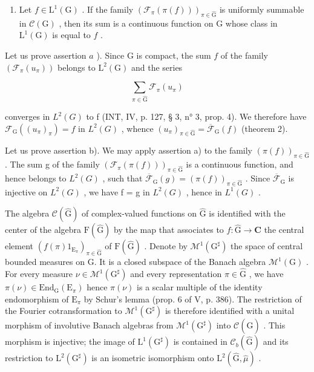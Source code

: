 \begin{enumerate}
\def\labelenumi{\alph{enumi})}
\setcounter{enumi}{1}
\tightlist
\item
  Let \(f \in \mathrm{L}^1(\mathrm{G})\) . If the family \((\mathcal{F}_\pi(\pi(f)))_{\pi \in \widehat{\mathrm{G}}}\) is uniformly summable in \(\mathcal{C}(\mathrm{G})\) , then its sum is a continuous function on \(\mathrm{G}\) whose class in \(\mathrm{L}^1(\mathrm{G})\) is equal to \(f\) .
\end{enumerate}

Let us prove assertion \(a\) ). Since G is compact, the sum \(f\) of the family \((\mathcal{F}_{\pi}(u_{\pi}))\) belongs to \(\mathrm{L}^2 (\mathrm{G})\) and the series

\[
\sum_ {\pi \in \widehat {\mathrm{G}}} \mathcal {F} _ {\pi} (u _ {\pi})
\]

converges in \(L^{2}(G)\) to f (INT, IV, p. 127, § 3, n° 3, prop. 4). We therefore have \(\mathcal{F}_{\mathrm{G}}((u_{\pi})_{\pi}) = f\) in \(L^{2}(G)\) , whence \((u_{\pi})_{\pi \in \widehat{\mathrm{G}}} = \overline{\mathcal{F}}_{\mathrm{G}}(f)\) (theorem 2).

Let us prove assertion b). We may apply assertion a) to the family \((\pi(f))_{\pi \in \widehat{\mathrm{G}}}\) . The sum g of the family \((\mathcal{F}_{\pi}(\pi(f)))_{\pi \in \widehat{\mathrm{G}}}\) is a continuous function, and hence belongs to \(L^{2}(G)\) , such that \(\overline{\mathcal{F}}_{\mathrm{G}}(g) = (\pi(f))_{\pi \in \widehat{\mathrm{G}}}\) . Since \(\overline{\mathcal{F}}_{\mathrm{G}}\) is injective on \(L^{2}(G)\) , we have f = g in \(L^{2}(G)\) , hence in \(L^{1}(G)\) .

The algebra \(\mathcal{C}(\widehat{\mathrm{G}})\) of complex-valued functions on \(\widehat{\mathrm{G}}\) is identified with the center of the algebra \(\mathrm{F}(\widehat{\mathrm{G}})\) by the map that associates to \(f\colon \widehat{\mathrm{G}}\to \mathbf{C}\) the central element \((f(\pi)1_{\mathrm{E}_{\pi}})_{\pi \in \widehat{\mathrm{G}}}\) of \(\mathrm{F}(\widehat{\mathrm{G}})\) . Denote by \(\mathcal{M}^1 (\mathrm{G}^\sharp)\) the space of central bounded measures on G. It is a closed subspace of the Banach algebra \(\mathcal{M}^1 (\mathrm{G})\) . For every measure \(\nu \in \mathcal{M}^1 (\mathrm{G}^\sharp)\) and every representation \(\pi \in \widehat{\mathrm{G}}\) , we have \(\pi (\nu)\in \mathrm{End}_{\mathrm{G}}(\mathrm{E}_{\pi})\) hence \(\pi (\nu)\) is a scalar multiple of the identity endomorphism of \(\mathrm{E}_{\pi}\) by Schur's lemma (prop. 6 of V, p. 386). The restriction of the Fourier cotransformation to \(\mathcal{M}^1 (\mathrm{G}^\sharp)\) is therefore identified with a unital morphism of involutive Banach algebras from \(\mathcal{M}^1 (\mathrm{G}^\sharp)\) into \(\mathcal{C}(\widehat{\mathrm{G}})\) . This morphism is injective; the image of \(\mathrm{L}^1 (\mathrm{G}^\sharp)\) is contained in \(\mathcal{C}_b(\widehat{\mathrm{G}})\) and its restriction to \(\mathrm{L}^2 (\mathrm{G}^\sharp)\) is an isometric isomorphism onto \(\mathrm{L}^2 (\widehat{\mathrm{G}},\widehat{\mu})\) .

